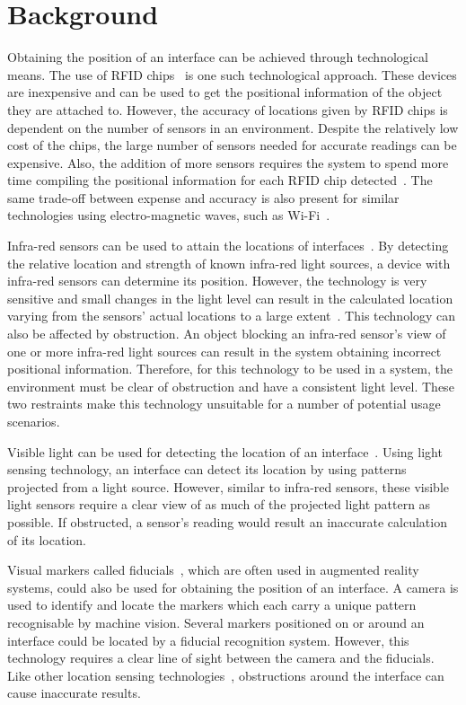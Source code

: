 \documentclass{bmcart}
\begin{document}
\section*{Background}\label{sec:related}

Obtaining the position of an interface can be achieved through technological means.
The use of RFID chips~\cite{Ni2004} is one such technological approach.
These devices are inexpensive and can be used to get the positional information of the object they are attached to.
However, the accuracy of locations given by RFID chips is dependent on the number of sensors in an environment.
Despite the relatively low cost of the chips, the large number of sensors needed for accurate readings can be expensive.
Also, the addition of more sensors requires the system to spend more time compiling the positional information for each RFID chip detected~\cite{Ni2004}.
The same trade-off between expense and accuracy is also present for similar technologies using electro-magnetic waves, such as Wi-Fi~\cite{Cheng2005}.

Infra-red sensors can be used to attain the locations of interfaces~\cite{Kortuem2005}.
By detecting the relative location and strength of known infra-red light sources, a device with infra-red sensors can determine its position.
However, the technology is very sensitive and small changes in the light level can result in the calculated location varying from the sensors' actual locations to a large extent~\cite{Kortuem2005}.
This technology can also be affected by obstruction.
An object blocking an infra-red sensor's view of one or more infra-red light sources can result in the system obtaining incorrect positional information.
Therefore, for this technology to be used in a system, the environment must be clear of obstruction and have a consistent light level.
These two restraints make this technology unsuitable for a number of potential usage scenarios.

Visible light can be used for detecting the location of an interface~\cite{Lee2004}.
Using light sensing technology, an interface can detect its location by using patterns projected from a light source.
However, similar to infra-red sensors, these visible light sensors require a clear view of as much of the projected light pattern as possible.
If obstructed, a sensor's reading would result an inaccurate calculation of its location.

Visual markers called fiducials~\cite{Bose1990}, which are often used in augmented reality systems, could also be used for obtaining the position of an interface.
A camera is used to identify and locate the markers which each carry a unique pattern recognisable by machine vision.
Several markers positioned on or around an interface could be located by a fiducial recognition system.
However, this technology requires a clear line of sight between the camera and the fiducials.
Like other location sensing technologies~\cite{Lee2004,Kortuem2005,Ni2004}, obstructions around the interface can cause inaccurate results.
\end{document}
